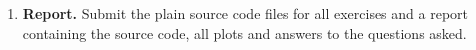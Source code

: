 \documentclass[12pt]{article}
\newcommand{\K}{\text{K}}
\newcommand{\Na}{\text{Na}}
\newcommand{\Leak}{\text{leak}}
\newcommand{\tderiv}[1]{\frac{\mathrm{d}#1}{\mathrm{d}t}}
\begin{document}
\begin{enumerate}
\item {\bf Report.} Submit the plain source code files for all exercises
         and a report containing the source code, all plots and answers to the
         questions asked.

% 
% 
% 
% 

\end{enumerate}
\end{document}
